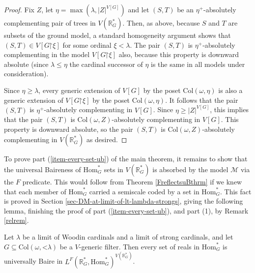 \documentclass[fleqn, 11pt]{amsart}
\theoremstyle{plain}
\theoremstyle{definition}
\theoremstyle{remark}
\newcommand{\Hom}{\mathrm{Hom}}
\newcommand{\uB}{\mathrm{uB}}
\newcommand{\Col}{\mathrm{Col}}
\newcommand{\restrict}{\mathord{\restriction}}
\begin{document}
\begin{proof}
 Fix $Z$, let $\eta = \max(\lambda, \left|Z\right|^{V[G]})$ and let $(S,T)$ be an $\eta^{+}$-absolutely complementing pair of trees in $V(\mathbb{R}^*_G)$. Then, as above, because $S$ and $T$ are subsets of the ground model, a standard homogeneity argument shows that $(S,T) \in V[G \restrict \xi]$ for some ordinal $\xi < \lambda$. The pair $(S,T)$ is $\eta^{+}$-absolutely complementing in the model $V[G \restrict \xi]$ also, because this property is downward absolute (since $\lambda \leq \eta$ the cardinal successor of $\eta$ is the same in all models under consideration).

Since $\eta \ge \lambda$, every generic extension of $V[G]$ by the poset $\Col(\omega,\eta)$ is also a generic extension of $V[G \restrict \xi]$ by the poset $\Col(\omega,\eta)$. It follows that the pair $(S,T)$ is $\eta^{+}$-absolutely complementing in $V[G]$. Since $\eta \ge \left|Z\right|^{V[G]}$, this implies that the pair $(S,T)$ is $\Col(\omega, Z)$-absolutely complementing in $V[G]$. This property is downward absolute, so the pair $(S,T)$ is $\Col(\omega, Z)$-absolutely complementing in $V(\mathbb{R}^*_G)$ as desired.
\end{proof}

To prove part (\ref{item-every-set-ub}) of the main theorem, it remains to show that the universal Baireness of $\Hom^*_G$ sets in $V(\mathbb{R}^*_G)$ is absorbed by the model $\mathcal{M}$ via the $F$ predicate. This would follow from Theorem \ref{FreflectsuBthrm} if we knew that each member of $\Hom^{*}_{G}$ carried a semiscale coded by a set in $\Hom^{*}_{G}$. This fact is proved in Section \ref{sec-DM-at-limit-of-lt-lambda-strongs}, giving the following lemma, finishing the proof of part (\ref{item-every-set-ub}), and part (1), by Remark \ref{relrem}. 


\begin{lem*}[\ref{lem-absorption-of-uB}]
 Let $\lambda$ be a limit of Woodin cardinals and a limit of strong cardinals, and  let $G \subseteq \Col(\omega,\mathord{<}\lambda)$ be a $V$-generic filter.
 Then every set of reals in $\Hom^*_G$ is universally Baire in $L^F(\mathbb{R}^*_G, \Hom^*_G)^{V(\mathbb{R}^*_G)}$.
\end{lem*}
 
 
\end{document}
